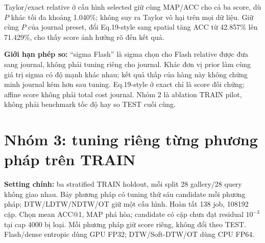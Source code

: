 \documentclass[11pt,a4paper]{article}
\begin{document}
Taylor/exact relative ở cấu hình selected giữ cùng MAP/ACC cho cả ba score,
dù $P$ khác tối đa khoảng 1.040\%; không suy ra Taylor vô hại trên mọi dữ liệu.
Giữ cùng $P$ của journal preset, đổi Eq.19-style sang spatial tăng ACC
từ 42.857\% lên 71.429\%, cho thấy score ảnh hưởng rõ đến kết quả.

\textbf{Giới hạn phép so:} ``sigma Flash'' là sigma chọn cho Flash relative
được đưa sang journal, không phải tuning riêng cho journal. Khác đơn vị prior
làm cùng giá trị sigma có độ mạnh khác nhau; kết quả thấp của hàng này
không chứng minh journal kém hơn sau tuning. Eq.19-style ở exact chỉ là
score đối chứng; affine score không phải total cost journal.
Nhóm 2 là ablation TRAIN pilot, không phải benchmark tốc độ hay so TEST cuối cùng.

\section{Nhóm 3: tuning riêng từng phương pháp trên TRAIN}
\label{sec:g3}
\textbf{Setting chính:} ba stratified TRAIN holdout, mỗi split 28 gallery/28 query
không giao nhau. Bảy phương pháp có tuning thử sáu candidate mỗi phương pháp;
DTW/LDTW/NDTW/OT giữ một cấu hình. Hoàn tất 138 job, 108192 cặp.
Chọn mean ACC@1, MAP phá hòa; candidate có cặp chưa đạt residual $10^{-3}$
tại cap 4000 bị loại. Mỗi phương pháp giữ score riêng, không đổi theo TEST.
Flash/dense entropic dùng GPU FP32; DTW/Soft-DTW/OT dùng CPU FP64.
\begingroup\small
\end{document}
